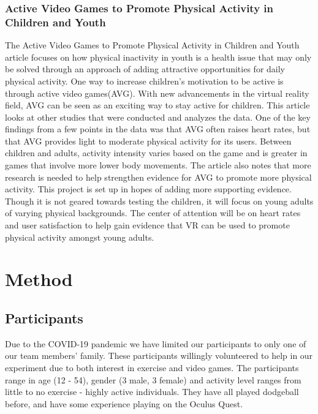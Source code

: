 \documentclass{sigchi}
\begin{document}
\subsubsection{Active Video Games to Promote Physical Activity in Children and Youth}

The Active Video Games to Promote Physical Activity in Children and Youth article\cite{biddiss_2010} focuses on how physical inactivity in youth is a health issue that may only be solved through an approach of adding attractive opportunities for daily physical activity. One way to increase children’s motivation to be active is through active video games(AVG). With new advancements in the virtual reality field, AVG can be seen as an exciting way to stay active for children. This article looks at other studies that were conducted and analyzes the data. One of the key findings from a few points in the data was that AVG often raises heart rates, but that AVG provides light to moderate physical activity for its users. Between children and adults, activity intensity varies based on the game and is greater in games that involve more lower body movements. The article also notes that more research is needed to help strengthen evidence for AVG to promote more physical activity. This project is set up in hopes of adding more supporting evidence. Though it is not geared towards testing the children, it will focus on young adults of varying physical backgrounds. The center of attention will be on heart rates and user satisfaction to help gain evidence that VR can be used to promote physical activity amongst young adults.

\section{Method}
\subsection{Participants}
Due to the COVID-19 pandemic we have limited our participants to only one of our team members' family. These participants willingly volunteered to help in our experiment due to both interest in exercise and video games. The participants range in age (12 - 54), gender (3 male, 3 female) and activity level ranges from little to no exercise - highly active individuals. They have all played dodgeball before, and have some experience playing on the Oculus Quest.
\end{document}
